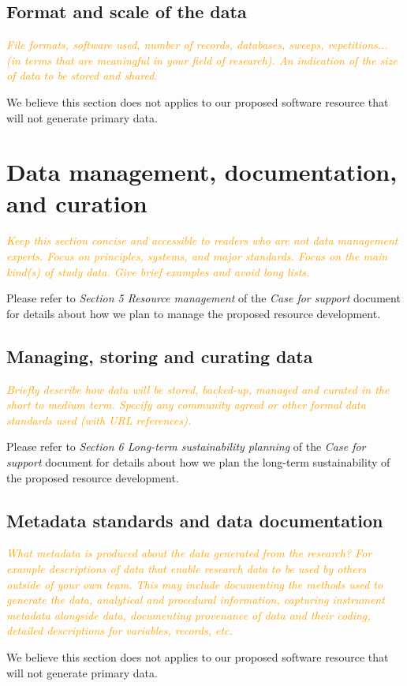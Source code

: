 \documentclass[a4paper,11pt]{article}
\begin{document}
\subsection{Format and scale of the data}

\textcolor{orange}{\textit{File formats, software used, number of records, databases, sweeps, repetitions... (in terms that are meaningful in your field of research). An indication of the size of data to be stored and shared.}}

We believe this section does not applies to our proposed software resource that
will not generate primary data.

\section{Data management, documentation, and curation}

\textcolor{orange}{\textit{Keep this section concise and accessible to readers who are not data management experts.  Focus on principles, systems, and major standards. Focus on the main kind(s) of study data.  Give brief examples and avoid long lists.}}

Please refer to \emph{Section 5 Resource management} of the \emph{Case for
support} document for details about how we plan to manage the proposed resource
development.

\subsection{Managing, storing and curating data}

\textcolor{orange}{\textit{Briefly describe how data will be stored, backed-up, managed and curated in the short to medium term. Specify any community agreed or other formal data standards used (with URL references).}}

Please refer to \emph{Section 6 Long-term sustainability planning} of the
\emph{Case for support} document for details about how we plan the long-term
sustainability of the proposed resource development.

\subsection{Metadata standards and data documentation}

\textcolor{orange}{\textit{What metadata is produced about the data generated from the research? For example descriptions of data that enable research data to be used by others outside of your own team.  This may include documenting the methods used to generate the data, analytical and procedural information, capturing instrument metadata alongside data, documenting provenance of data and their coding, detailed descriptions for variables, records, etc.}}

We believe this section does not applies to our proposed software resource that
will not generate primary data.

% 


\end{document}
